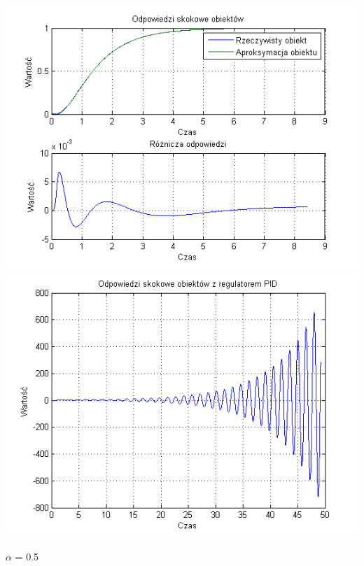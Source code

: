 \documentclass[10pt,a4paper]{article}
\begin{document}
\begin{center}
\includegraphics[scale=1]{images/dwa/skrypt_123.png}\\
\includegraphics[scale=1]{images/dwa/skrypt_124.png}\\
\end{center}
\newpage
$\alpha$ = 0.5
\end{document}
